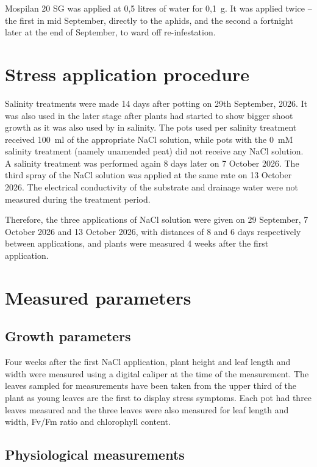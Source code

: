 Mospilan 20 SG was applied at 0,5 litres of water for 0,1~g. It was applied twice – the first in mid September, directly to the aphids, and the second a fortnight later at the end of September, to ward off re-infestation.

\section{Stress application procedure}

Salinity treatments were made 14 days after potting on 29th September, 2026. It was also used in the later stage after plants had started to show bigger shoot growth as it was also used by \textcite{Morshedloo2025} in salinity. The pots used per salinity treatment received 100~ml of the appropriate NaCl solution, while pots with the 0~mM salinity treatment (namely unamended peat) did not receive any NaCl solution. A salinity treatment was performed again 8 days later on 7 October 2026. The third spray of the NaCl solution was applied at the same rate on 13 October 2026. The electrical conductivity of the substrate and drainage water were not measured during the treatment period.

Therefore, the three applications of NaCl solution were given on 29 September, 7 October 2026 and 13 October 2026, with distances of 8 and 6 days respectively between applications, and plants were measured 4 weeks after the first application.

\section{Measured parameters}

\subsection{Growth parameters}

Four weeks after the first NaCl application, plant height and leaf length and width were measured using a digital caliper at the time of the measurement. The leaves sampled for measurements have been taken from the upper third of the plant as young leaves are the first to display stress symptoms. Each pot had three leaves measured and the three leaves were also measured for leaf length and width, Fv/Fm ratio and chlorophyll content.

\subsection{Physiological measurements}

